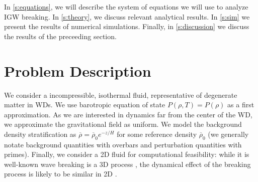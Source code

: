 \documentclass[
        fleqn,
        usenatbib,
    ]{mnras}
\begin{document}




In \autoref{s:equations}, we will describe the system of equations we will
use to analyze IGW breaking. In \autoref{s:theory}, we discuss relevant
analytical results. In \autoref{s:sim} we present the results of numerical
simulations. Finally, in \autoref{s:discussion} we discuss the results of the
preceeding section.

\section{Problem Description}\label{s:equations}

We consider a incompressible, isothermal fluid, representative of degenerate
matter in WDs. We use barotropic equation of state $P(\rho, T) = P(\rho)$ as a
first approximation. As we are interested in dynamics far from the center of the
WD, we approximate the gravitational field as uniform. We model the background
density stratification as $\overline{\rho} = \overline{\rho}_0 e^{-z/H}$ for
some reference density $\overline{\rho}_0$ (we generally notate background
quantities with overbars and perturbation quantities with primes). Finally, we
consider a 2D fluid for computational feasibility: while it is well-known wave
breaking is a 3D process \citep{klostermeyer,winters1994}, the dynamical effect
of the breaking process is likely to be similar in 2D \citep{barker_ogilvie}.
\end{document}
